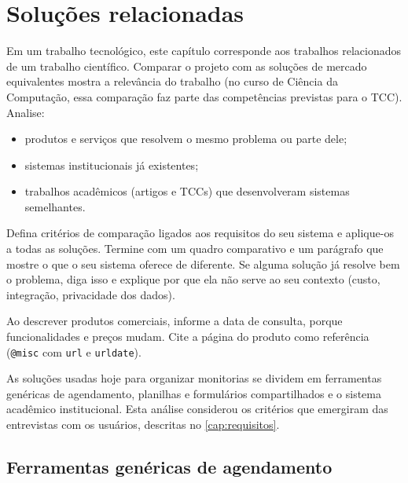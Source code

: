 \chapter{Soluções relacionadas}
\label{cap:solucoes}

\begin{instrucao}
Em um trabalho tecnológico, este capítulo corresponde aos trabalhos
relacionados de um trabalho científico. Comparar o projeto com as soluções de
mercado equivalentes mostra a relevância do trabalho (no curso de Ciência da
Computação, essa comparação faz parte das competências previstas para o TCC).
Analise:
\begin{itemize}
  \item produtos e serviços que resolvem o mesmo problema ou parte dele;
  \item sistemas institucionais já existentes;
  \item trabalhos acadêmicos (artigos e TCCs) que desenvolveram sistemas
        semelhantes.
\end{itemize}
Defina critérios de comparação ligados aos requisitos do seu sistema e
aplique-os a todas as soluções. Termine com um quadro comparativo e um
parágrafo que mostre o que o seu sistema oferece de diferente. Se alguma
solução já resolve bem o problema, diga isso e explique por que ela não serve
ao seu contexto (custo, integração, privacidade dos dados).

Ao descrever produtos comerciais, informe a data de consulta, porque
funcionalidades e preços mudam. Cite a página do produto como referência
(\verb|@misc| com \verb|url| e \verb|urldate|).
\end{instrucao}

As soluções usadas hoje para organizar monitorias se dividem em ferramentas
genéricas de agendamento, planilhas e formulários compartilhados e o sistema
acadêmico institucional. Esta análise considerou os critérios que emergiram
das entrevistas com os usuários, descritas no \cref{cap:requisitos}.

\section{Ferramentas genéricas de agendamento}

